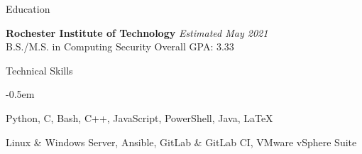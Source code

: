 \documentclass[8pt]{resume} %
\begin{document}

\begin{rSection}{Education}

{\bf Rochester Institute of Technology} \hfill {\em Estimated May 2021} \\ 
B.S./M.S. in Computing Security \hfill Overall GPA: 3.33

\end{rSection}


\begin{rSection}{Technical Skills}

    \begin{multicols}{2}[]

    \begin{description}
        \itemsep -0.5em
        \item[Languages] Python, C, Bash, C++, JavaScript, PowerShell, Java,
            \LaTeX
        \item[Tools/Software] Linux \& Windows Server, Ansible, GitLab \&
            GitLab CI, VMware vSphere Suite
    \end{description}

    \end{multicols}

\end{rSection}

\end{document}
